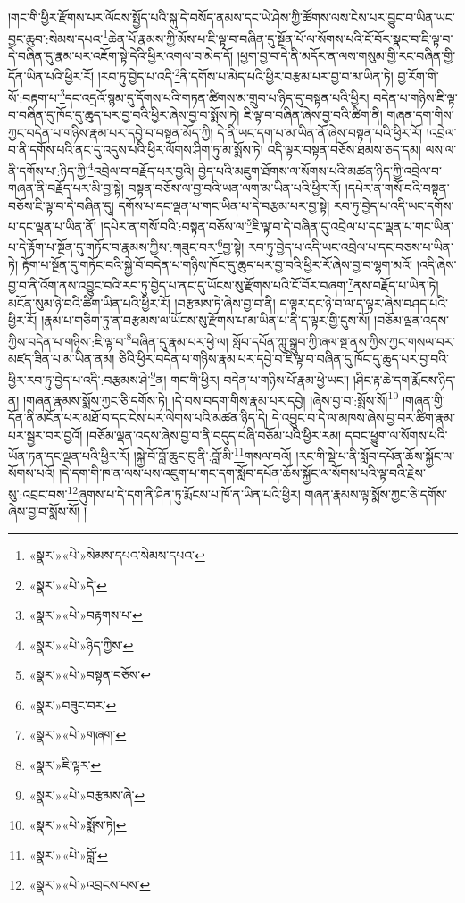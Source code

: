 །གང་གི་ཕྱིར་རྫོགས་པར་ལོངས་སྤྱོད་པའི་སྐུ་དེ་བསོད་ནམས་དང་ཡེ་ཤེས་ཀྱི་ཚོགས་ལས་ངེས་པར་བྱུང་བ་ཡིན་ཡང་བྱང་ཆུབ་:སེམས་དཔའ་\footnote{«སྣར་»«པེ་»སེམས་དཔའ་སེམས་དཔའ་}ཆེན་པོ་རྣམས་ཀྱི་མོས་པ་ཇི་ལྟ་བ་བཞིན་དུ་སྔོན་པོ་ལ་སོགས་པའི་ངོ་བོར་སྣང་བ་ཇི་ལྟ་བ་དེ་བཞིན་དུ་རྣམ་པར་འཇོག་སྟེ་དེའི་ཕྱིར་འགལ་བ་མེད་དོ། །ཕྱག་བྱ་བ་དེ་ནི་མདོར་ན་ལས་གསུམ་གྱི་རང་བཞིན་གྱི་དོན་ཡིན་པའི་ཕྱིར་རོ། །རབ་ཏུ་བྱེད་པ་འདི་\footnote{«སྣར་»«པེ་»དེ་}ནི་དགོས་པ་མེད་པའི་ཕྱིར་བརྩམ་པར་བྱ་བ་མ་ཡིན་ཏེ། བྱ་རོག་གི་སོ་:བརྟག་པ་\footnote{«སྣར་»«པེ་»བརྟགས་པ་}དང་འདྲའོ་སྙམ་དུ་དོགས་པའི་གཏན་ཚིགས་མ་གྲུབ་པ་ཉིད་དུ་བསྟན་པའི་ཕྱིར། བདེན་པ་གཉིས་ཇི་ལྟ་བ་བཞིན་དུ་ཁོང་དུ་ཆུད་པར་བྱ་བའི་ཕྱིར་ཞེས་བྱ་བ་སྨོས་ཏེ། ཇི་ལྟ་བ་བཞིན་ཞེས་བྱ་བའི་ཚིག་ནི། གཞན་དག་གིས་ཀྱང་བདེན་པ་གཉིས་རྣམ་པར་དབྱེ་བ་བསྟན་མོད་ཀྱི། དེ་ནི་ཡང་དག་པ་མ་ཡིན་ནོ་ཞེས་བསྟན་པའི་ཕྱིར་རོ། །འབྲེལ་བ་ནི་དགོས་པའི་ནང་དུ་འདུས་པའི་ཕྱིར་ལོགས་ཤིག་ཏུ་མ་སྨོས་ཏེ། འདི་ལྟར་བསྟན་བཅོས་ཐམས་ཅད་དམ། ལས་ལ་ནི་དགོས་པ་:ཉིད་ཀྱི་\footnote{«སྣར་»«པེ་»ཉིད་ཀྱིས་}འབྲེལ་བ་བརྗོད་པར་བྱའི། བྱེད་པའི་མཇུག་ཐོགས་ལ་སོགས་པའི་མཚན་ཉིད་ཀྱི་འབྲེལ་བ་གཞན་ནི་བརྗོད་པར་མི་བྱ་སྟེ། བསྟན་བཅོས་ལ་བྱ་བའི་ཡན་ལག་མ་ཡིན་པའི་ཕྱིར་རོ། །དཔེར་ན་གསོ་བའི་བསྟན་བཅོས་ཇི་ལྟ་བ་དེ་བཞིན་དུ། དགོས་པ་དང་ལྡན་པ་གང་ཡིན་པ་དེ་བརྩམ་པར་བྱ་སྟེ། རབ་ཏུ་བྱེད་པ་འདི་ཡང་དགོས་པ་དང་ལྡན་པ་ཡིན་ནོ། །དཔེར་ན་གསོ་བའི་:བསྟན་བཅོས་ལ་\footnote{«སྣར་»«པེ་»བསྟན་བཅོས་}ཇི་ལྟ་བ་དེ་བཞིན་དུ་འབྲེལ་པ་དང་ལྡན་པ་གང་ཡིན་པ་དེ་རྟོག་པ་སྔོན་དུ་གཏོང་བ་རྣམས་ཀྱིས་:གཟུང་བར་\footnote{«སྣར་»བཟུང་བར་}བྱ་སྟེ། རབ་ཏུ་བྱེད་པ་འདི་ཡང་འབྲེལ་པ་དང་བཅས་པ་ཡིན་ཏེ། རྟོག་པ་སྔོན་དུ་གཏོང་བའི་སྐྱེ་བོ་བདེན་པ་གཉིས་ཁོང་དུ་ཆུད་པར་བྱ་བའི་ཕྱིར་རོ་ཞེས་བྱ་བ་ལྷག་མའོ། །འདི་ཞེས་བྱ་བ་ནི་འོག་ནས་འབྱུང་བའི་རབ་ཏུ་བྱེད་པ་ནང་དུ་ཡོངས་སུ་རྫོགས་པའི་ངོ་བོར་བཞག་\footnote{«སྣར་»«པེ་»གཞག་}ནས་བརྗོད་པ་ཡིན་ཏེ། མངོན་སུམ་ཉེ་བའི་ཚིག་ཡིན་པའི་ཕྱིར་རོ། །བརྩམས་ཏེ་ཞེས་བྱ་བ་ནི། ད་ལྟར་དང་ཉེ་བ་ལ་ད་ལྟར་ཞེས་བཤད་པའི་ཕྱིར་རོ། །རྣམ་པ་གཅིག་ཏུ་ན་བརྩམས་ལ་ཡོངས་སུ་རྫོགས་པ་མ་ཡིན་པ་ནི་ད་ལྟར་གྱི་དུས་སོ། །བཅོམ་ལྡན་འདས་ཀྱིས་བདེན་པ་གཉིས་:ཇི་ལྟ་བ་\footnote{«སྣར་»ཇི་ལྟར་}བཞིན་དུ་རྣམ་པར་ཕྱེ་ལ། སློབ་དཔོན་ཀླུ་སྒྲུབ་ཀྱི་ཞལ་སྔ་ནས་ཀྱིས་ཀྱང་གསལ་བར་མཛད་ཟིན་པ་མ་ཡིན་ནམ། ཅིའི་ཕྱིར་བདེན་པ་གཉིས་རྣམ་པར་དབྱེ་བ་ཇི་ལྟ་བ་བཞིན་དུ་ཁོང་དུ་ཆུད་པར་བྱ་བའི་ཕྱིར་རབ་ཏུ་བྱེད་པ་འདི་:བརྩམས་ཤེ་\footnote{«སྣར་»«པེ་»བརྩམས་ཞེ་}ན། གང་གི་ཕྱིར། བདེན་པ་གཉིས་པོ་རྣམ་ཕྱེ་ཡང་། །ཤིང་རྟ་ཆེ་དག་རྨོངས་ཉིད་ན། །གཞན་རྣམས་སྨོས་ཀྱང་ཅི་དགོས་ཏེ། །དེ་བས་བདག་གིས་རྣམ་པར་དབྱེ། །ཞེས་བྱ་བ་:སྨོས་སོ།\footnote{«སྣར་»«པེ་»སྨོས་ཏེ།} །གཞན་གྱི་དོན་ནི་མངོན་པར་མཐོ་བ་དང་ངེས་པར་ལེགས་པའི་མཚན་ཉིད་དེ། དེ་འབྱུང་བ་དེ་ལ་མཁས་ཞེས་བྱ་བར་ཚིག་རྣམ་པར་སྦྱར་བར་བྱའོ། །བཅོམ་ལྡན་འདས་ཞེས་བྱ་བ་ནི་བདུད་བཞི་བཅོམ་པའི་ཕྱིར་རམ། དབང་ཕྱུག་ལ་སོགས་པའི་ཡོན་ཏན་དང་ལྡན་པའི་ཕྱིར་རོ། །སྐྱེ་བོ་བློ་ཆུང་ངུ་ནི་:བློ་མི་\footnote{«སྣར་»«པེ་»བློ་}གསལ་བའོ། །རང་གི་སྡེ་པ་ནི་སློབ་དཔོན་ཆོས་སྐྱོང་ལ་སོགས་པའོ། །དེ་དག་གི་ཁ་ན་ལས་པས་འཇུག་པ་གང་དག་སློབ་དཔོན་ཆོས་སྐྱོང་ལ་སོགས་པའི་ལྟ་བའི་རྗེས་སུ་:འབྲང་བས་\footnote{«སྣར་»«པེ་»འབྲངས་པས་}ཞུགས་པ་དེ་དག་ནི་ཤིན་ཏུ་རྨོངས་པ་ཁོ་ན་ཡིན་པའི་ཕྱིར། གཞན་རྣམས་ལྟ་སྨོས་ཀྱང་ཅི་དགོས་ཞེས་བྱ་བ་སྨོས་སོ། །

